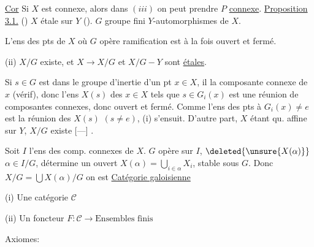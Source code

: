 \uline{Cor}
Si $X$ est connexe, alors dans $(iii)$ on peut prendre $P$ \uline{connexe}.
\uline{Proposition 3.1.} () $X$ étale sur $Y$ ().
$G$ groupe fini  $Y$-automorphismes de $X$.

  L'ens des pts de $X$ où $G$ opère  ramification est à la fois ouvert et fermé.

(ii)  $X/G$ existe, et $X\to X/G$ et $X/G-Y$ sont \uline{étales}.


Si $s\in G$  est dans le groupe d'inertie d'un pt $x\in X$, il  la composante connexe de $x$ (vérif), donc l'ens $X(s)$ des $x\in X$ tels que $s\in G_i(x)$ est une réunion de composantes connexes, donc ouvert et fermé.
Comme  l'ens des pts à $G_i(x)\ne e$ est la réunion des $X(s)$ $(s\ne e)$, (i) s'ensuit.
D'autre part, $X$ étant qu. affine sur $Y$, $X/G$ existe [---]
  .

Soit $I$ l'ens des comp. connexes de $X$.
$G$ opère sur $I$, 
 $\deleted{\unsure{X(\alpha)}}$ $\alpha\in I/G$, détermine un ouvert $X(\alpha)=\bigcup_{i\in\alpha}X_i$, stable sous $G$.
Donc $X/G=\bigcup X(\alpha)/G$ on est
\uline{Catégorie galoisienne}

(i) Une catégorie $\mathcal C$

(ii) Un foncteur $F:\mathcal C\to\text{Ensembles finis}$

Axiomes:


